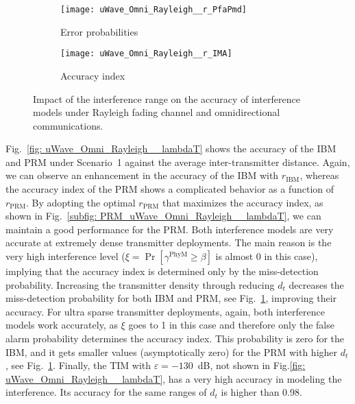 \documentclass[12pt, draftclsnofoot, onecolumn]{IEEEtran}
\begin{document}
\begin{figure}[t!]
  \centering
  \begin{subfigure}{0.49\columnwidth}
    \centering
    \texttt{[image: uWave\_Omni\_Rayleigh\_\_r\_PfaPmd]}
    \caption{Error probabilities}
    \label{subfig: uWave_Omni_Rayleigh__r_PfaPmd}
  \end{subfigure}
  \begin{subfigure}{0.49\columnwidth}
       \centering
  \texttt{[image: uWave\_Omni\_Rayleigh\_\_r\_IMA]}
    \caption{Accuracy index}
    \label{subfig: uWave_Omni_Rayleigh__r_IMA}
    \end{subfigure}
  \caption{Impact of the interference range on the accuracy of interference models under Rayleigh fading channel and omnidirectional communications.}
  \label{fig: uWave_Omni_Rayleigh__r}
\end{figure}
Fig.~\ref{fig: uWave_Omni_Rayleigh__lambdaT} shows the accuracy of the IBM and PRM under Scenario~1 against the average inter-transmitter distance. Again, we can observe an enhancement in the accuracy of the IBM with $r_{\text{IBM}}$, whereas the accuracy index of the PRM shows a complicated behavior as a function of $r_{\text{PRM}}$. By adopting the optimal $r_{\text{PRM}}$ that maximizes the accuracy index, as shown in Fig.~\ref{subfig: PRM_uWave_Omni_Rayleigh__lambdaT}, we can maintain a good performance for the PRM. Both interference models are very accurate at extremely dense transmitter deployments. The main reason is the very high interference level ($\xi = \Pr \left[ \gamma^{\text{PhyM}} \geq \beta \right]$ is almost 0 in this case), implying that the accuracy index is determined only by the miss-detection probability. Increasing the transmitter density through reducing $d_t$ decreases the miss-detection probability for both IBM and PRM, see Fig.~\ref{subfig: uWave_Omni_Rayleigh__r_PfaPmd}, improving their accuracy. For ultra sparse transmitter deployments, again, both interference models work accurately, as $\xi$ goes to 1 in this case and therefore only the false alarm probability determines the accuracy index. This probability is zero for the IBM, and it gets smaller values (asymptotically zero) for the PRM with higher $d_t$, see Fig.~\ref{subfig: uWave_Omni_Rayleigh__r_PfaPmd}. Finally, the TIM with $\varepsilon = -130$~dB, not shown in Fig.\ref{fig: uWave_Omni_Rayleigh__lambdaT}, has a very high accuracy in modeling the interference. Its accuracy for the same ranges of $d_t$ is higher than 0.98.
\end{document}
